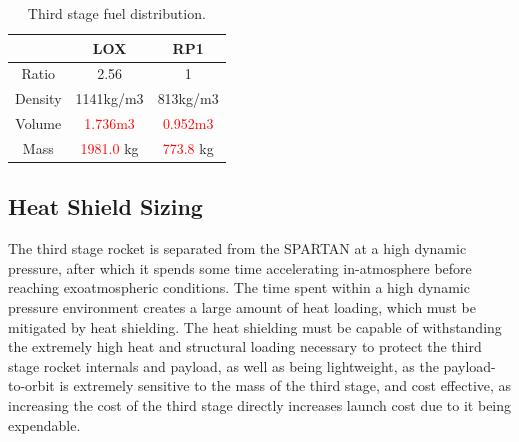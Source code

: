 	

\begin{table}[h]
	\centering
	\begin{tabular}{|c|c|c|}
		\hline  & \textbf{LOX} & \textbf{RP1} \\ 
		\hline Ratio & 2.56\cite{RPE} & 1 \\ 
		\hline Density & 1141kg/m3 & 813kg/m3\cite{Magee}\\ 
		\hline Volume & \textcolor{red}{1.736m3} & \textcolor{red}{0.952m3} \\ 
		\hline Mass & \textcolor{red}{1981.0} kg & \textcolor{red}{773.8} kg \\ 
		\hline 
	\end{tabular} 
	\caption{Third stage fuel distribution.}
	\label{tab:Fuel}
\end{table}



\subsection{Heat Shield Sizing}


The third stage rocket is separated from the SPARTAN at a high dynamic pressure, after which it spends some time accelerating in-atmosphere before reaching exoatmospheric conditions. The time spent within a high dynamic pressure environment creates a large amount of heat loading, which must be mitigated by heat shielding. The heat shielding must be capable of withstanding the extremely high heat and structural loading necessary to protect the third stage rocket internals and payload, as well as being lightweight, as the payload-to-orbit is extremely sensitive to the mass of the third stage, and cost effective, as increasing the cost of the third stage directly increases launch cost due to it being expendable. 


